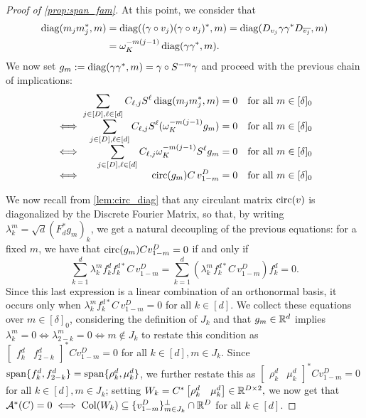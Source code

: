 \begin{proof}[Proof of \cref{prop:span_fam}]
  At this point, we consider that \begin{align} \operatorname{diag}(m_j m_j^*, m) &= \operatorname{diag}((\gamma \circ v_j) (\gamma \circ v_j)^*, m) = \operatorname{diag}(D_{v_j} \gamma \gamma^* D_{\overline{v_j}}, m) \\ &= \omega_K^{-m(j - 1)} \operatorname{diag}(\gamma \gamma^*, m). \label{eq:gam_diag}\end{align}  We now set $g_m := \operatorname{diag}(\gamma \gamma^*, m) = \gamma \circ S^{-m} \gamma$ and proceed with the previous chain of implications:
  \[\arraycolsep=1.4pt%
  \begin{array}{c>{\displaystyle}rcl@{\quad}r}
    & \sum_{j \in [D], \ell \in [d]} C_{\ell, j} S^{\ell} \diag(m_j m_j^*, m) & = & 0 & \text{for all} \ m \in [\delta]_0 \\
    \iff & \sum_{j \in [D], \ell \in [d]} C_{\ell, j} S^{\ell} (\omega_K^{-m(j - 1)} g_m) & = & 0 & \text{for all} \ m \in [\delta]_0 \\
    \iff & \sum_{j \in [D], \ell \in [d]} C_{\ell, j} \omega_K^{-m(j - 1)} S^{\ell} g_m & = & 0 & \text{for all} \ m \in [\delta]_0 \\
    \iff & \circop(g_m) C \, v^D_{1-m} & = & 0 & \text{for all} \ m \in [\delta]_0 \\
  \end{array}\]

  We now recall from \cref{lem:circ_diag} that any circulant matrix $\operatorname{circ}(v)$ is diagonalized by the Discrete Fourier Matrix, so that, by writing $\lambda_k^m = \sqrt{d}(F_d^* g_m)_k$, we get a natural decoupling of the previous equations: for a fixed $m$, we have that $\operatorname{circ}(g_m) C v_{1 - m}^D = 0$ if and only if \[\sum_{k = 1}^d \lambda_k^m f_k^d f_k^{d*} C \, v_{1 - m}^D = \sum_{k = 1}^d (\lambda_k^m f_k^{d*} C \, v_{1 - m}^D) f_k^d = 0.\]  Since this last expression is a linear combination of an orthonormal basis, it occurs only when $\lambda_k^m f_k^{d*} C \, v^D_{1 - m} = 0$ for all $k \in [d]$.  We collect these equations over $m \in [\delta]_0$, considering the definition of $J_k$ and that $g_m \in \mathbb{R}^d$ implies $\lambda_k^m = 0 \iff \lambda_{2 - k}^m = 0 \iff m \notin J_k$ to restate this condition as $\begin{bmatrix} f_k^d & f_{2 - k}^d \end{bmatrix}^* C v^D_{1 - m} = 0$ for all $k \in [d], m \in J_k$.  Since $\operatorname{span}\{f_k^d, f_{2 - k}^d\} = \operatorname{span}\{\rho_k^d, \mu_k^d\}$, we further restate this as $\begin{bmatrix} \rho_k^d & \mu_k^d \end{bmatrix}^* C v_{1 - m}^D = 0$ for all $k \in [d], m \in J_k$; setting $W_k = C^* \begin{bmatrix} \rho_k^d & \mu_k^d \end{bmatrix} \in \mathbb{R}^{D \times 2},$ we now get that $\mathcal{A}^*(C) = 0 \iff \operatorname{Col}(W_k) \subseteq \{v_{1 - m}^D\}_{m \in J_k}^\perp \cap \mathbb{R}^D$ for all $k \in [d]$.


\end{proof}
